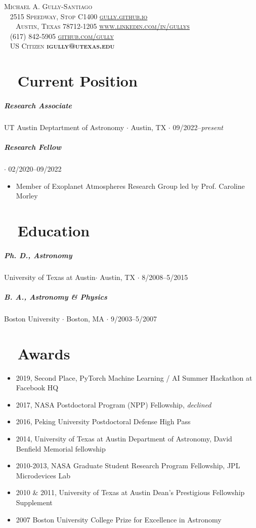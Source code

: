 \documentclass[10pt,letterpaper]{article}
\newcommand{\namestyle}{\Huge \scshape}
\newcommand{\addressstyle}{\color{addresscolor}  \footnotesize \sffamily \upshape}
\begin{document}
\begin{flushleft}
    \namestyle Michael A. Gully-Santiago \\[0.3em]
    \addressstyle
    \faMapMarked* ~ 2515 Speedway, Stop C1400  \hfill \url{gully.github.io} ~ \faLink \\
    ~ ~ Austin, Texas 78712-1205  \hfill  \url{www.linkedin.com/in/gullys} ~ \faLinkedinIn \\
    \faPhone ~ (617) 842-5905 \hfill \url{github.com/gully} ~ \faGithub \\
    \faFlagUsa ~ US Citizen \hfill \textbf{igully@utexas.edu} ~ \faAt\\

\end{flushleft}

\small

\section*{\faToggleOn ~ Current Position}

\subparagraph{Research Associate}
UT Austin Deptartment of Astronomy $\cdot$ Austin, TX $\cdot$ 09/2022--\emph{present}
\subparagraph{Research Fellow}
$\cdot$ 02/2020--09/2022
\begin{itemize}
    \item Member of Exoplanet Atmospheres Research Group led by Prof. Caroline Morley
\end{itemize}

\section*{\faGraduationCap ~ Education}

\subparagraph{Ph. D., Astronomy}
University of Texas at Austin$\cdot$ Austin, TX $\cdot$ 8/2008--5/2015

\subparagraph{B. A., Astronomy \& Physics}
Boston University $\cdot$ Boston, MA $\cdot$ 9/2003--5/2007


\section*{\faTrophy ~ Awards}

\begin{itemize}
    \item 2019, Second Place, PyTorch Machine Learning / AI Summer Hackathon at Facebook HQ
    \item 2017, NASA Postdoctoral Program (NPP) Fellowship,  \emph{declined}
    \item 2016, Peking University Postdoctoral Defense High Pass
    \item 2014, University of Texas at Austin Department of Astronomy, David Benfield Memorial fellowship
    \item 2010-2013, NASA Graduate Student Research Program Fellowship, JPL Microdevices Lab
    \item 2010 \& 2011, University of Texas at Austin Dean's Prestigious Fellowship Supplement
    \item 2007 Boston University College Prize for Excellence in Astronomy
\end{itemize}
\end{document}
